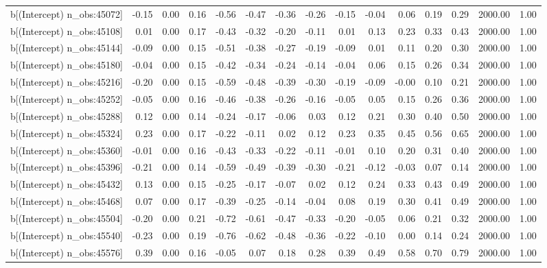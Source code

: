 \begin{table}[ht]
\begin{tabular}{rrrrrrrrrrrrrrr}
  b[(Intercept) n\_obs:45072] & -0.15 & 0.00 & 0.16 & -0.56 & -0.47 & -0.36 & -0.26 & -0.15 & -0.04 & 0.06 & 0.19 & 0.29 & 2000.00 & 1.00 \\ 
  b[(Intercept) n\_obs:45108] & 0.01 & 0.00 & 0.17 & -0.43 & -0.32 & -0.20 & -0.11 & 0.01 & 0.13 & 0.23 & 0.33 & 0.43 & 2000.00 & 1.00 \\ 
  b[(Intercept) n\_obs:45144] & -0.09 & 0.00 & 0.15 & -0.51 & -0.38 & -0.27 & -0.19 & -0.09 & 0.01 & 0.11 & 0.20 & 0.30 & 2000.00 & 1.00 \\ 
  b[(Intercept) n\_obs:45180] & -0.04 & 0.00 & 0.15 & -0.42 & -0.34 & -0.24 & -0.14 & -0.04 & 0.06 & 0.15 & 0.26 & 0.34 & 2000.00 & 1.00 \\ 
  b[(Intercept) n\_obs:45216] & -0.20 & 0.00 & 0.15 & -0.59 & -0.48 & -0.39 & -0.30 & -0.19 & -0.09 & -0.00 & 0.10 & 0.21 & 2000.00 & 1.00 \\ 
  b[(Intercept) n\_obs:45252] & -0.05 & 0.00 & 0.16 & -0.46 & -0.38 & -0.26 & -0.16 & -0.05 & 0.05 & 0.15 & 0.26 & 0.36 & 2000.00 & 1.00 \\ 
  b[(Intercept) n\_obs:45288] & 0.12 & 0.00 & 0.14 & -0.24 & -0.17 & -0.06 & 0.03 & 0.12 & 0.21 & 0.30 & 0.40 & 0.50 & 2000.00 & 1.00 \\ 
  b[(Intercept) n\_obs:45324] & 0.23 & 0.00 & 0.17 & -0.22 & -0.11 & 0.02 & 0.12 & 0.23 & 0.35 & 0.45 & 0.56 & 0.65 & 2000.00 & 1.00 \\ 
  b[(Intercept) n\_obs:45360] & -0.01 & 0.00 & 0.16 & -0.43 & -0.33 & -0.22 & -0.11 & -0.01 & 0.10 & 0.20 & 0.31 & 0.40 & 2000.00 & 1.00 \\ 
  b[(Intercept) n\_obs:45396] & -0.21 & 0.00 & 0.14 & -0.59 & -0.49 & -0.39 & -0.30 & -0.21 & -0.12 & -0.03 & 0.07 & 0.14 & 2000.00 & 1.00 \\ 
  b[(Intercept) n\_obs:45432] & 0.13 & 0.00 & 0.15 & -0.25 & -0.17 & -0.07 & 0.02 & 0.12 & 0.24 & 0.33 & 0.43 & 0.49 & 2000.00 & 1.00 \\ 
  b[(Intercept) n\_obs:45468] & 0.07 & 0.00 & 0.17 & -0.39 & -0.25 & -0.14 & -0.04 & 0.08 & 0.19 & 0.30 & 0.41 & 0.49 & 2000.00 & 1.00 \\ 
  b[(Intercept) n\_obs:45504] & -0.20 & 0.00 & 0.21 & -0.72 & -0.61 & -0.47 & -0.33 & -0.20 & -0.05 & 0.06 & 0.21 & 0.32 & 2000.00 & 1.00 \\ 
  b[(Intercept) n\_obs:45540] & -0.23 & 0.00 & 0.19 & -0.76 & -0.62 & -0.48 & -0.36 & -0.22 & -0.10 & 0.00 & 0.14 & 0.24 & 2000.00 & 1.00 \\ 
  b[(Intercept) n\_obs:45576] & 0.39 & 0.00 & 0.16 & -0.05 & 0.07 & 0.18 & 0.28 & 0.39 & 0.49 & 0.58 & 0.70 & 0.79 & 2000.00 & 1.00 \\ 

\end{tabular}
\end{table}
